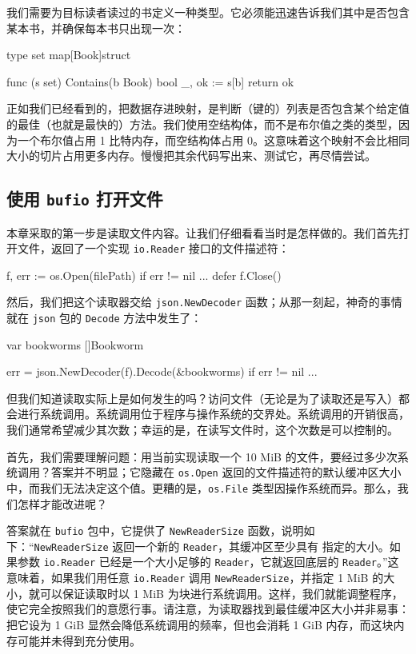 我们需要为目标读者读过的书定义一种类型。它必须能迅速告诉我们其中是否包含某本书，并确保每本书只出现一次：

\begin{gocode}[]
type set map[Book]struct{}

func (s set) Contains(b Book) bool {
    _, ok := s[b]
    return ok
}
\end{gocode}

正如我们已经看到的，把数据存进映射，是判断（键的）列表是否包含某个给定值的最佳（也就是最快的）方法。我们使用空结构体，而不是布尔值之类的类型，因为一个布尔值占用 1 比特内存，而空结构体占用 0。这意味着这个映射不会比相同大小的切片占用更多内存。慢慢把其余代码写出来、测试它，再尽情尝试。

\subsection{使用 \texttt{bufio} 打开文件}

本章采取的第一步是读取文件内容。让我们仔细看看当时是怎样做的。我们首先打开文件，返回了一个实现 \texttt{io.Reader} 接口的文件描述符：

\begin{gocode}[]
f, err := os.Open(filePath)
if err != nil {...}
defer f.Close()
\end{gocode}

然后，我们把这个读取器交给 \texttt{json.NewDecoder} 函数；从那一刻起，神奇的事情就在 \texttt{json} 包的 \texttt{Decode} 方法中发生了：

\begin{gocode}[]
var bookworms []Bookworm

err = json.NewDecoder(f).Decode(&bookworms)
if err != nil {...}
\end{gocode}

但我们知道读取实际上是如何发生的吗？访问文件（无论是为了读取还是写入）都会进行系统调用。系统调用位于程序与操作系统的交界处。系统调用的开销很高，我们通常希望减少其次数；幸运的是，在读写文件时，这个次数是可以控制的。

首先，我们需要理解问题：用当前实现读取一个 10 MiB 的文件，要经过多少次系统调用？答案并不明显；它隐藏在 \texttt{os.Open} 返回的文件描述符的默认缓冲区大小中，而我们无法决定这个值。更糟的是，\texttt{os.File} 类型因操作系统而异。那么，我们怎样才能改进呢？

答案就在 \texttt{bufio} 包中，它提供了 \texttt{NewReaderSize} 函数，说明如下：“\texttt{NewReaderSize} 返回一个新的 \texttt{Reader}，其缓冲区至少具有
指定的大小。如果参数 \texttt{io.Reader} 已经是一个大小足够的 \texttt{Reader}，它就返回底层的 \texttt{Reader}。”这意味着，如果我们用任意 \texttt{io.Reader} 调用 \texttt{NewReaderSize}，并指定 1 MiB 的大小，就可以保证读取时以 1 MiB 为块进行系统调用。这样，我们就能调整程序，使它完全按照我们的意愿行事。请注意，为读取器找到最佳缓冲区大小并非易事：把它设为 1 GiB 显然会降低系统调用的频率，但也会消耗 1 GiB 内存，而这块内存可能并未得到充分使用。

